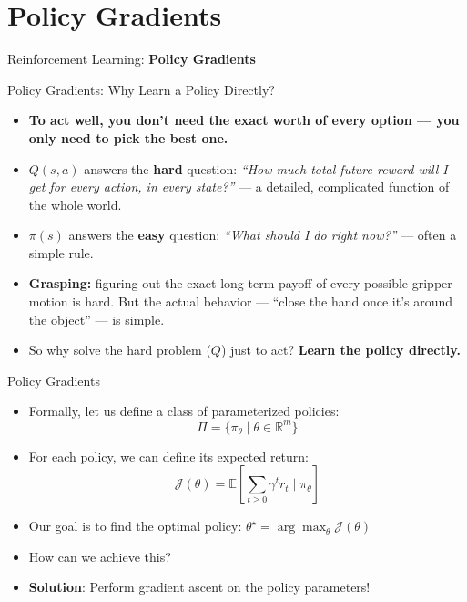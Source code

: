 \section{Policy Gradients}
\begin{frame}{}
    \LARGE Reinforcement Learning: \textbf{Policy Gradients}
\end{frame}

\begin{frame}{Policy Gradients: Why Learn a Policy Directly?}
    \begin{itemize}
        \setlength{\itemsep}{0.9em}
        \item {\large \textbf{To act well, you don't need the exact worth of every option --- you only need to pick the best one.}}
        \item $Q(s,a)$ answers the \textbf{hard} question: \textit{``How much total future reward will I get for every action, in every state?''} --- a detailed, complicated function of the whole world.
        \item $\pi(s)$ answers the \textbf{easy} question: \textit{``What should I do right now?''} --- often a simple rule.
        \pause
        \item \textbf{Grasping:} figuring out the exact long-term payoff of every possible gripper motion is hard. But the actual behavior --- ``close the hand once it's around the object'' --- is simple.
        \item[$\Rightarrow$] So why solve the hard problem ($Q$) just to act? \textbf{Learn the policy directly.}
    \end{itemize}
\end{frame}

\begin{frame}{Policy Gradients}
    \begin{itemize}
        \item Formally, let us define a class of parameterized policies: 
        $$\Pi = \{ \pi_\theta \mid \theta \in \mathbb{R}^m \}$$
        \item For each policy, we can define its expected return:
        $$\mathcal{J}(\theta) = \mathbb{E} \left [ \sum_{t \geq 0} \gamma^t r_t \mid \pi_\theta \right ]$$
        \pause
        \item Our goal is to find the optimal policy: $\theta^{\star} = \arg \max_\theta \mathcal{J}(\theta)$
        \item How can we achieve this?
        \pause
        \item \textbf{Solution}: Perform gradient ascent on the policy parameters!
    \end{itemize}
\end{frame}

